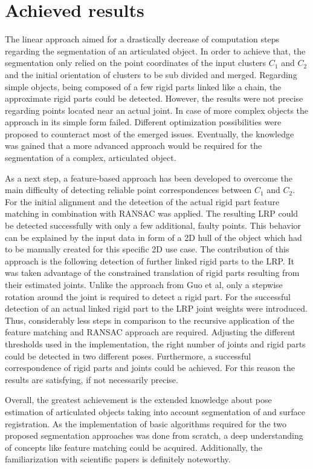 \section{Achieved results}
The linear approach aimed for a drastically  decrease of computation steps regarding the segmentation of an articulated object. In order to achieve that, the segmentation only relied on the point coordinates of the input clusters $C_1$ and $C_2$ and the initial orientation of clusters to be sub divided and merged. Regarding simple objects, being composed of a few rigid parts linked like a chain, the approximate rigid parts could be detected. However, the results were not precise regarding points located near an actual joint. In case of more complex objects the approach in its simple form failed. Different optimization possibilities were proposed to counteract most of the emerged issues. Eventually, the knowledge was gained that a more advanced approach would be required for the segmentation of a complex, articulated object. 

As a next step, a feature-based approach has been developed to overcome the main difficulty of detecting reliable point correspondences between $C_1$ and $C_2$. For the initial alignment and the detection of the actual rigid part feature matching in combination with RANSAC was applied. The resulting LRP could be detected successfully with only a few additional, faulty points. This behavior can be explained by the input data in form of a 2D hull of the object which had to be manually created for this specific 2D use case. The contribution of this approach is the following detection of further linked rigid parts to the LRP. It was taken advantage of the constrained translation of rigid parts resulting from their estimated joints. Unlike the approach from Guo et al, only a stepwise rotation around the joint is required to detect a rigid part. For the successful detection of an actual linked rigid part to the LRP joint weights were introduced. Thus, considerably less steps in comparison to the recursive application of the feature matching and RANSAC approach are required. Adjusting the different thresholds used in the implementation, the right number of joints and rigid parts could be detected in two different poses. Furthermore, a successful correspondence of rigid parts and joints could be achieved. For this reason the results are satisfying, if not necessarily precise. 

Overall, the greatest achievement is the extended knowledge about pose estimation of articulated objects taking into account segmentation of and surface registration. As the implementation of basic algorithms required for the two proposed segmentation approaches was done from scratch, a deep understanding of concepts like feature matching could be acquired. Additionally, the  familiarization with scientific papers is definitely noteworthy.

